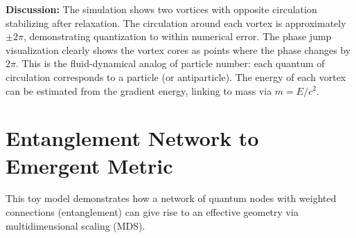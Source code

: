 \documentclass[12pt,a4paper]{book}
\begin{document}
\textbf{Discussion:} The simulation shows two vortices with opposite circulation stabilizing after relaxation. The circulation around each vortex is approximately $\pm 2\pi$, demonstrating quantization to within numerical error. The phase jump visualization clearly shows the vortex cores as points where the phase changes by $2\pi$. This is the fluid-dynamical analog of particle number: each quantum of circulation corresponds to a particle (or antiparticle). The energy of each vortex can be estimated from the gradient energy, linking to mass via $m = E/c^2$.

\section{Entanglement Network to Emergent Metric}

This toy model demonstrates how a network of quantum nodes with weighted connections (entanglement) can give rise to an effective geometry via multidimensional scaling (MDS).
\end{document}
